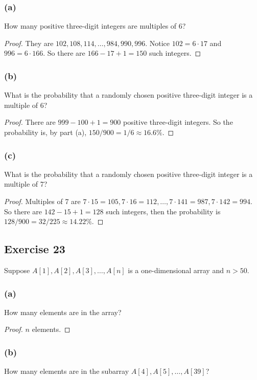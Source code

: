 \documentclass[14pt]{extarticle}
\begin{document}
\subsubsection{(a)}
How many positive three-digit integers are multiples of 6?

\begin{proof}
They are \(102, 108, 114, \ldots, 984, 990, 996\). Notice \(102 = 6 \cdot 17\) and \(996 = 6 \cdot 166\). So there 
are \(166 - 17 + 1 = 150\) such integers.
\end{proof}

\subsubsection{(b)}
What is the probability that a randomly chosen positive three-digit integer is a multiple of 6?

\begin{proof}
There are \(999 - 100 + 1 = 900\) positive three-digit integers. So the probability is, by part (a), 
\(150/900 = 1/6 \approx 16.6\%\).
\end{proof}

\subsubsection{(c)}
What is the probability that a randomly chosen positive three-digit integer is a multiple of 7?

\begin{proof}
Multiples of 7 are \(7 \cdot 15 = 105, 7 \cdot 16 = 112, \ldots, 7 \cdot 141 = 987, 7 \cdot 142 = 994\). So there
are \(142 - 15 + 1 = 128\) such integers, then the probability is \(128/900 = 32/225 \approx 14.22\%\).
\end{proof}

\subsection{Exercise 23}
Suppose \(A[1], A[2], A[3], \ldots, A[n]\) is a one-dimensional array and \(n > 50\).

\subsubsection{(a)}
How many elements are in the array?

\begin{proof}
$n$ elements.
\end{proof}

\subsubsection{(b)}
How many elements are in the subarray \(A[4], A[5], \ldots, A[39]\)?
\end{document}
